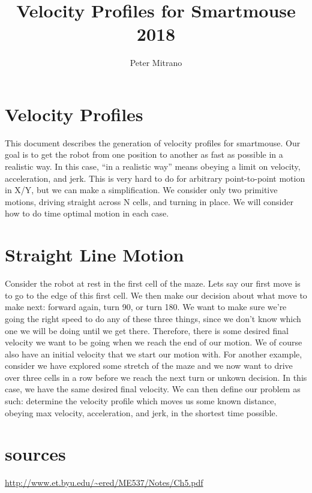 \documentclass{article}
\begin{document}
\title{Velocity Profiles for Smartmouse 2018}
\author{Peter Mitrano}

\maketitle

\section{Velocity Profiles}

This document describes the generation of velocity profiles for smartmouse. Our goal is to get the robot from one position to another as fast as possible in a realistic way. In this case, ``in a realistic way'' means obeying a limit on velocity, acceleration, and jerk. This is very hard to do for arbitrary point-to-point motion in X/Y, but we can make a simplification. We consider only two primitive motions, driving straight across N cells, and turning in place. We will consider how to do time optimal motion in each case.

\section{Straight Line Motion}

Consider the robot at rest in the first cell of the maze. Lets say our first move is to go to the edge of this first cell. We then make our decision about what move to make next: forward again, turn 90, or turn 180. We want to make sure we're going the right speed to do any of these three things, since we don't know which one we will be doing until we get there. Therefore, there is some desired final velocity we want to be going when we reach the end of our motion. We of course also have an initial velocity that we start our motion with. For another example, consider we have explored some stretch of the maze and we now want to drive over three cells in a row before we reach the next turn or unkown decision. In this case, we have the same desired final velocity. We can then define our problem as such: determine the velocity profile which moves us some known distance, obeying max velocity, acceleration, and jerk, in the shortest time possible.

\section{sources}
\url{http://www.et.byu.edu/~ered/ME537/Notes/Ch5.pdf}
\end{document}
